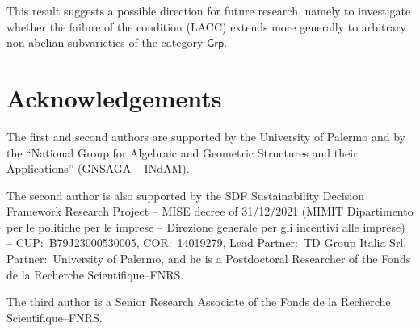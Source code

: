 \documentclass[reqno,hidelinks,a4paper]{amsart}
\theoremstyle{plain}
\theoremstyle{definition}
\theoremstyle{remark}
\numberwithin{equation}{section}
\newcommand*{\CondName}[1]{{\rm (#1)}}
\newcommand*{\LACC}{\CondName{LACC}}
\newcommand{\Grp}{\ensuremath{\mathsf{Grp}}}
\begin{document}
This result suggests a possible direction for future research, namely to investigate whether the failure of the condition \LACC{} extends more generally to arbitrary non-abelian subvarieties of the category \(\Grp\).

\section*{Acknowledgements}
The first and second authors are supported by the University of Palermo and by the ``National Group for Algebraic and Geometric Structures and their Applications'' (GNSAGA -- INdAM).

The second author is also supported by the SDF Sustainability Decision Framework Research Project -- MISE decree of 31/12/2021 (MIMIT Dipartimento per le politiche per le imprese -- Direzione generale per gli incentivi alle imprese) -- CUP:~B79J23000530005, COR:~14019279, Lead Partner:~TD Group Italia Srl, Partner:~University of Palermo, and he is a Postdoctoral Researcher of the Fonds de la Recherche Scientifique--FNRS.

The third author is a Senior Research Associate of the Fonds de la Recherche Scientifique--FNRS.

\end{document}
